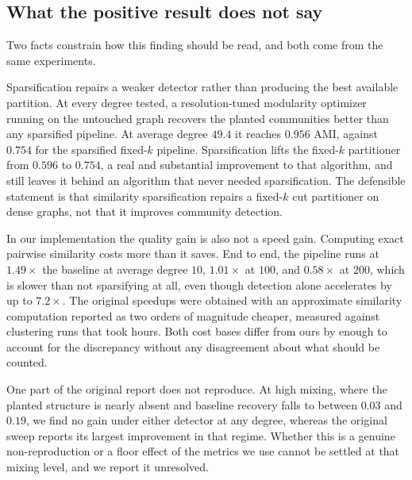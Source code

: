\subsection{What the positive result does not say}

Two facts constrain how this finding should be read, and both come from the same
experiments.

Sparsification repairs a weaker detector rather than producing the best available
partition. At every degree tested, a resolution-tuned modularity optimizer
running on the untouched graph recovers the planted communities better than any
sparsified pipeline. At average degree $49.4$ it reaches $0.956$ AMI, against
$0.754$ for the sparsified fixed-$k$ pipeline. Sparsification lifts the fixed-$k$
partitioner from $0.596$ to $0.754$, a real and substantial improvement to that
algorithm, and still leaves it behind an algorithm that never needed
sparsification. The defensible statement is that similarity sparsification
repairs a fixed-$k$ cut partitioner on dense graphs, not that it improves
community detection.

In our implementation the quality gain is also not a speed gain. Computing exact
pairwise similarity costs more than it saves. End to end, the pipeline runs at
$1.49\times$ the baseline at average degree $10$, $1.01\times$ at $100$, and
$0.58\times$ at $200$, which is slower than not sparsifying at all, even though
detection alone accelerates by up to $7.2\times$. The original speedups were
obtained with an approximate similarity computation reported as two orders of
magnitude cheaper, measured against clustering runs that took hours. Both cost
bases differ from ours by enough to account for the discrepancy without any
disagreement about what should be counted.

One part of the original report does not reproduce. At high mixing, where the
planted structure is nearly absent and baseline recovery falls to between $0.03$
and $0.19$, we find no gain under either detector at any degree, whereas the
original sweep reports its largest improvement in that regime. Whether this is a
genuine non-reproduction or a floor effect of the metrics we use cannot be
settled at that mixing level, and we report it unresolved.

